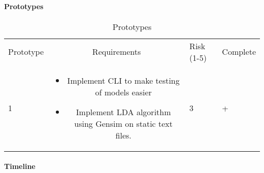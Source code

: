 
\paragraph{Prototypes}
\begin{table}[h]
    \caption{Prototypes}
    \begin{tabular}{ l c l l}
      Prototype & Requirements & Risk (1-5) & Complete \\
      1 & 
          \begin{itemize}
          \item Implement CLI to make testing of models easier
          \item Implement LDA algorithm using Gensim on static text
              files.
          \end{itemize} &
                          3 & + \\

    \end{tabular} \label{sec:planning:prototypes-table}
\end{table}

\paragraph{Timeline}

